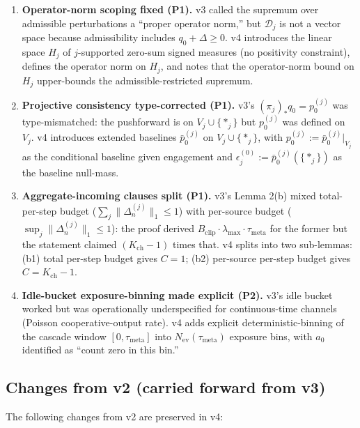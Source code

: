 \documentclass{article}
\newcommand{\Bclip}{B_{\mathrm{clip}}}
\newcommand{\Kch}{K_{\mathrm{ch}}}
\newcommand{\Nev}{N_{\mathrm{ev}}}
\newcommand{\lammax}{\lambda_{\max}}
\newcommand{\taumeta}{\tau_{\mathrm{meta}}}
\begin{document}
\begin{enumerate}
\item \textbf{Operator-norm scoping fixed (P1).} v3 called the
  supremum over admissible perturbations a ``proper operator
  norm,'' but $\mathcal{D}_j$ is not a vector space because
  admissibility includes $q_0 + \Delta \geq 0$.  v4 introduces the
  linear space $H_j$ of $j$-supported zero-sum signed measures
  (no positivity constraint), defines the operator norm on $H_j$,
  and notes that the operator-norm bound on $H_j$ upper-bounds
  the admissible-restricted supremum.

\item \textbf{Projective consistency type-corrected (P1).} v3's
  $(\pi_j)_* q_0 = p_0^{(j)}$ was type-mismatched: the pushforward
  is on $V_j \cup \{*_j\}$ but $p_0^{(j)}$ was defined on $V_j$.
  v4 introduces extended baselines $\bar{p}_0^{(j)}$ on $V_j \cup
  \{*_j\}$, with $p_0^{(j)} := \bar{p}_0^{(j)}|_{V_j}$ as the
  conditional baseline given engagement and
  $\epsilon_j^{(0)} := \bar{p}_0^{(j)}(\{*_j\})$ as the baseline
  null-mass.

\item \textbf{Aggregate-incoming clauses split (P1).} v3's Lemma
  2(b) mixed total-per-step budget ($\sum_j \|\Delta_n^{(j)}\|_1
  \leq 1$) with per-source budget ($\sup_j \|\Delta_n^{(j)}\|_1
  \leq 1$): the proof derived $\Bclip \cdot \lammax \cdot \taumeta$
  for the former but the statement claimed $(\Kch - 1)$ times that.
  v4 splits into two sub-lemmas: (b1) total per-step budget gives
  $C = 1$; (b2) per-source per-step budget gives $C = \Kch - 1$.

\item \textbf{Idle-bucket exposure-binning made explicit (P2).}
  v3's idle bucket worked but was operationally underspecified for
  continuous-time channels (Poisson cooperative-output rate).  v4
  adds explicit deterministic-binning of the cascade window
  $[0, \taumeta]$ into $\Nev(\taumeta)$ exposure bins, with $a_0$
  identified as ``count zero in this bin.''
\end{enumerate}

\subsection{Changes from v2 (carried forward from v3)}

The following changes from v2 are preserved in v4:
\end{document}
